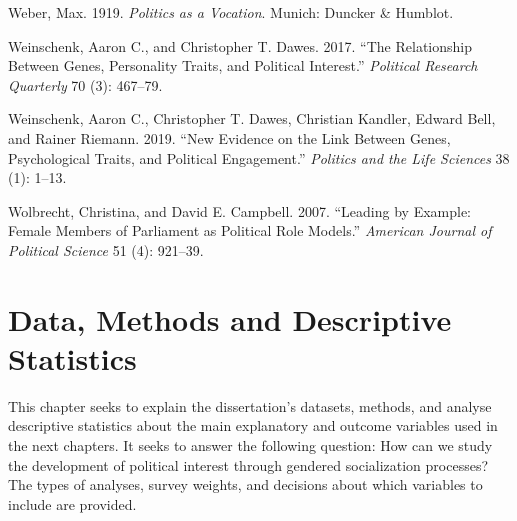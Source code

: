 \documentclass[
  letterpaper,
  DIV=11,
  numbers=noendperiod]{scrreprt}
\newlength{\cslhangindent}
\newlength{\cslentryspacingunit} %
\newenvironment{CSLReferences}[2] %
 {%
  \setlength{\parindent}{0pt}
  \ifodd #1
  \let\oldpar\par
  \def\par{\hangindent=\cslhangindent\oldpar}
  \fi
  \setlength{\parskip}{#2\cslentryspacingunit}
 }%
 {}
\begin{document}
\begin{CSLReferences}{1}{0}
\leavevmode{}%
Weber, Max. 1919. \emph{{Politics as a Vocation}}. Munich: Duncker \&
Humblot.

\leavevmode{}%
Weinschenk, Aaron C., and Christopher T. Dawes. 2017. {``{The
Relationship Between Genes, Personality Traits, and Political
Interest}.''} \emph{Political Research Quarterly} 70 (3): 467--79.

\leavevmode{}%
Weinschenk, Aaron C., Christopher T. Dawes, Christian Kandler, Edward
Bell, and Rainer Riemann. 2019. {``{New Evidence on the Link Between
Genes, Psychological Traits, and Political Engagement}.''}
\emph{Politics and the Life Sciences} 38 (1): 1--13.

\leavevmode{}%
Wolbrecht, Christina, and David E. Campbell. 2007. {``{Leading by
Example: Female Members of Parliament as Political Role Models}.''}
\emph{American Journal of Political Science} 51 (4): 921--39.

\end{CSLReferences}


\hypertarget{sec-chap2}{%
\chapter{Data, Methods and Descriptive Statistics}\label{sec-chap2}}

This chapter seeks to explain the dissertation's datasets, methods, and
analyse descriptive statistics about the main explanatory and outcome
variables used in the next chapters. It seeks to answer the following
question: How can we study the development of political interest through
gendered socialization processes? The types of analyses, survey weights,
and decisions about which variables to include are provided.

\hfill\break
\end{document}
